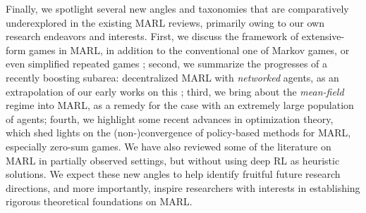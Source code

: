 Finally, we spotlight several new angles and  taxonomies that are comparatively underexplored in the existing MARL reviews, primarily owing to our own research endeavors and interests. First, we discuss the framework of extensive-form  games in MARL, in addition to the conventional one of Markov games, or even simplified repeated games \cite{bu2008comprehensive,hernandez2017survey,hernandez2018multiagent}; second, we summarize the progresses of a recently boosting subarea: decentralized MARL with \emph{networked} agents, as an extrapolation of our early works on this \cite{zhang2018fully,zhang18cdc,zhang2018finite}; third, we bring about the \emph{mean-field} regime into MARL, as a remedy for the case with an extremely large  population of agents; fourth, we highlight some recent advances in optimization theory, which shed lights on the (non-)convergence of policy-based methods for MARL, especially zero-sum games. We have also reviewed some of the literature on MARL in partially observed settings, but without using deep RL as heuristic solutions.  
We expect these new angles to help identify fruitful future research directions, and more importantly, inspire researchers with interests in establishing   rigorous theoretical foundations  on MARL.   













